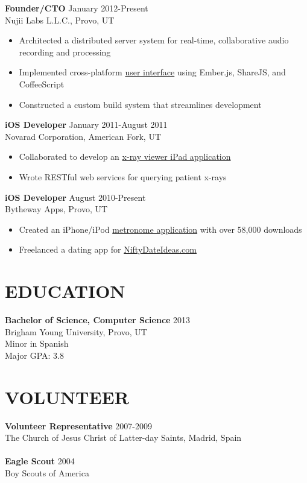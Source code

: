 \documentclass[margin]{res}
\begin{document}
\begin{resume}
      {\bf Founder/CTO} \hfill January 2012-Present \\
      Nujii Labs L.L.C., Provo, UT 
      \begin{itemize} \itemsep -2pt
        \item Architected a distributed server system for real-time,
        collaborative audio recording and processing
        \item Implemented cross-platform 
        \href{https://github.com/nujii/nujiistudio.js}{user interface}
        using Ember.js, ShareJS, and CoffeeScript
        \item Constructed a custom build system that streamlines development
      \end{itemize}

      {\bf iOS Developer} \hfill January 2011-August 2011 \\
      Novarad Corporation, American Fork, UT
      \begin{itemize} \itemsep -2pt
        \item Collaborated to develop an
        \href{http://ww1.novarad.net/ipad-viewers/}{x-ray viewer iPad application}
        \item Wrote RESTful web services for querying patient x-rays
      \end{itemize}

      {\bf iOS Developer} \hfill  August 2010-Present \\
      Bytheway Apps, Provo, UT
      \begin{itemize} \itemsep -2pt
        \item Created an iPhone/iPod
        \href{http://itunes.apple.com/us/app/backbeat-pro-metronome/id415229485?mt=8}{metronome application}
        with over 58,000 downloads
        \item Freelanced a dating app for
        \href{http://itunes.apple.com/us/app/nifty-date-ideas/id425978808?mt=8}{NiftyDateIdeas.com}
      \end{itemize}

    \section{EDUCATION}
      {\bf Bachelor of Science, Computer Science} \hfill 2013 \\
      Brigham Young University, Provo, UT\\
      Minor in Spanish\\
      Major GPA: 3.8

    \section{VOLUNTEER}
      {\bf Volunteer Representative} \hfill 2007-2009 \\
      The Church of Jesus Christ of Latter-day Saints, Madrid, Spain \\ \\
      {\bf Eagle Scout} \hfill 2004 \\
      Boy Scouts of America


\end{resume}
\end{document}
